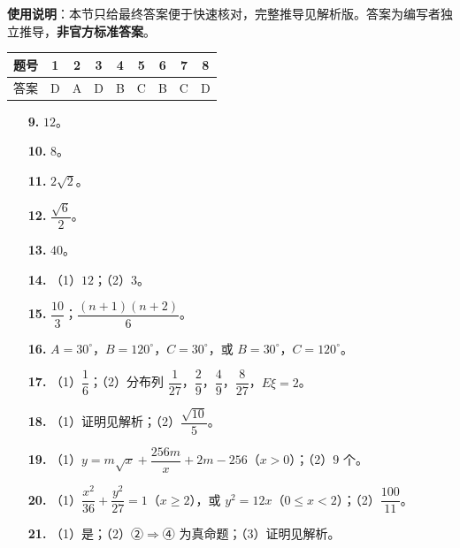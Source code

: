 
\begin{gknotice}
\textbf{使用说明}：本节只给最终答案便于快速核对，完整推导见解析版。答案为编写者独立推导，\textbf{非官方标准答案}。
\end{gknotice}

\begin{center}\begin{tabular}{ccccccccc}
\toprule
题号 & 1 & 2 & 3 & 4 & 5 & 6 & 7 & 8 \\
\midrule
答案 & D & A & D & B & C & B & C & D \\
\bottomrule
\end{tabular}\end{center}

\begin{itemize}[leftmargin=2.6em]
  \item[\textbf{9.}] $12$。
  \item[\textbf{10.}] $8$。
  \item[\textbf{11.}] $2\sqrt2$。
  \item[\textbf{12.}] $\dfrac{\sqrt6}{2}$。
  \item[\textbf{13.}] $40$。
  \item[\textbf{14.}] （1）$12$；（2）$3$。
  \item[\textbf{15.}] $\dfrac{10}{3}$；$\dfrac{(n+1)(n+2)}6$。
\end{itemize}

\begin{itemize}[leftmargin=2.6em]
  \item[\textbf{16.}] $A=30^\circ$，$B=120^\circ$，$C=30^\circ$，或 $B=30^\circ$，$C=120^\circ$。
  \item[\textbf{17.}] （1）$\dfrac16$；（2）分布列 $\dfrac1{27}$，$\dfrac29$，$\dfrac49$，$\dfrac8{27}$，$E\xi=2$。
  \item[\textbf{18.}] （1）证明见解析；（2）$\dfrac{\sqrt{10}}5$。
  \item[\textbf{19.}] （1）$y=m\sqrt x+\dfrac{256m}{x}+2m-256$（$x>0$）；（2）$9$ 个。
  \item[\textbf{20.}] （1）$\dfrac{x^2}{36}+\dfrac{y^2}{27}=1$（$x\geqslant2$），或 $y^2=12x$（$0\leqslant x<2$）；（2）$\dfrac{100}{11}$。
  \item[\textbf{21.}] （1）是；（2）②$\Rightarrow$④ 为真命题；（3）证明见解析。
\end{itemize}
